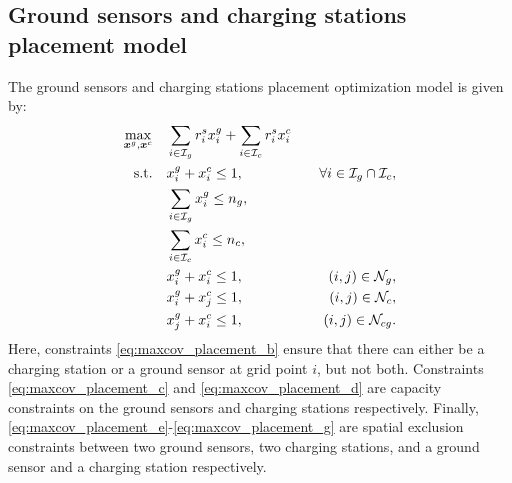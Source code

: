 \documentclass{article}
\newcommand{\set}[1]{\mathcal{#1}}
\begin{document}

\subsection{Ground sensors and charging stations placement model}
The ground sensors and charging stations placement optimization model is given by:
\begin{subequations}\label{eq:maxcov_placement}
    \begin{align} 
        \max_{\bm x^g, \bm x^c} &\quad \displaystyle \sum_{i \in \set I_g} r_i^s x_i^g + \sum_{i \in \set I_c} r_i^s x_i^c \label{eq:maxcov_placement_a} \\
        {\rm s.t. } &\quad \displaystyle x_i^g + x_i^c \leq 1, &\quad \forall i \in \set I_g \cap \set I_c, \label{eq:maxcov_placement_b} \\
        &\quad \displaystyle \sum_{i \in \set I_g} x_i^g \leq n_g, \label{eq:maxcov_placement_c} \\
        &\quad \displaystyle \sum_{i \in \set I_c} x_i^c \leq n_c, \label{eq:maxcov_placement_d} \\
        &\quad \displaystyle x_i^g + x_i^c \leq 1, &\quad (i,j) \in \set N_g, \label{eq:maxcov_placement_e} \\
        &\quad \displaystyle x_i^g + x_j^c \leq 1, &\quad (i,j) \in \set N_c, \label{eq:maxcov_placement_f} \\
        &\quad \displaystyle x_j^g + x_i^c \leq 1, &\quad (i,j) \in \set N_{cg}.\label{eq:maxcov_placement_g} 
    \end{align}
\end{subequations}
Here, constraints \eqref{eq:maxcov_placement_b} ensure that there can either be a charging station or a ground sensor at grid point $i$, but not both. Constraints \eqref{eq:maxcov_placement_c} and \eqref{eq:maxcov_placement_d} are capacity constraints on the ground sensors and charging stations respectively. Finally, \eqref{eq:maxcov_placement_e}-\eqref{eq:maxcov_placement_g} are spatial exclusion constraints between two ground sensors, two charging stations, and a ground sensor and a charging station respectively. 
\end{document}
